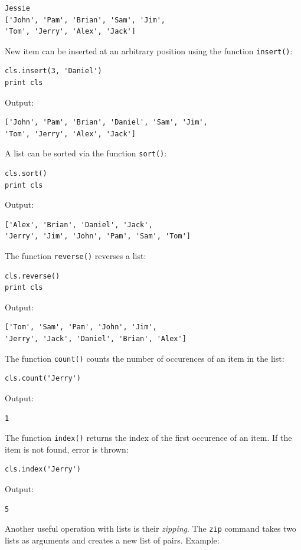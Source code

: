 \begin{verbatim}
Jessie
['John', 'Pam', 'Brian', 'Sam', 'Jim', 
'Tom', 'Jerry', 'Alex', 'Jack']
\end{verbatim}
New item can be inserted at an arbitrary position using the function {\tt insert()}:

\begin{verbatim}
cls.insert(3, 'Daniel')
print cls
\end{verbatim}
Output:

\begin{verbatim}
['John', 'Pam', 'Brian', 'Daniel', 'Sam', 'Jim', 
'Tom', 'Jerry', 'Alex', 'Jack']
\end{verbatim}
A list can be sorted via the function {\tt sort()}:

\begin{verbatim}
cls.sort()
print cls
\end{verbatim}
Output:

\begin{verbatim}
['Alex', 'Brian', 'Daniel', 'Jack', 
'Jerry', 'Jim', 'John', 'Pam', 'Sam', 'Tom']
\end{verbatim}
The function {\tt reverse()} reverses a list:

\begin{verbatim}
cls.reverse()
print cls
\end{verbatim}
Output:

\begin{verbatim}
['Tom', 'Sam', 'Pam', 'John', 'Jim', 
'Jerry', 'Jack', 'Daniel', 'Brian', 'Alex']
\end{verbatim}
The function {\tt count()} counts the number of occurences of an item
in the list:

\begin{verbatim}
cls.count('Jerry')
\end{verbatim}
Output:

\begin{verbatim}
1
\end{verbatim}
The function {\tt index()} returns the index of the first occurence 
of an item. If the item is not found, error is thrown:

\begin{verbatim}
cls.index('Jerry')
\end{verbatim}
Output:

\begin{verbatim}
5
\end{verbatim}
Another useful operation with lists is their {\em zipping}. The {\tt zip} command takes two lists as arguments 
and creates a new list of pairs. Example:

